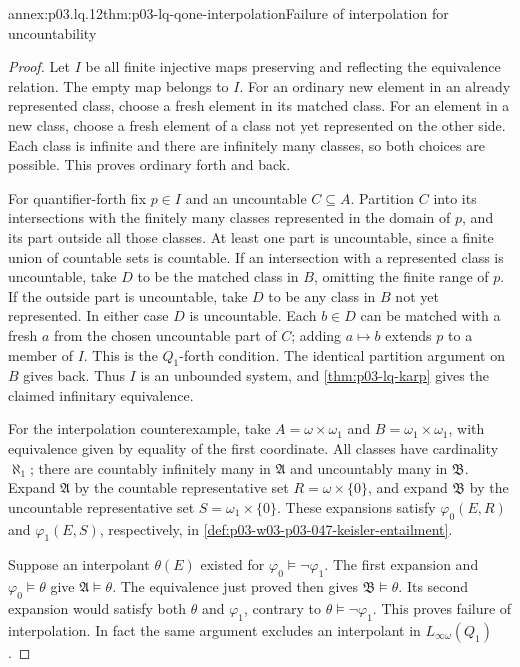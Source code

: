\begin{annexitem}{annex:p03.lq.12}{thm:p03-lq-qone-interpolation}{Failure of interpolation for uncountability}
\begin{proof}
Let \(I\) be all finite injective maps preserving and reflecting
the equivalence relation. The empty map belongs to \(I\).
For an ordinary new element in an already represented class,
choose a fresh element in its matched class. For an element in a
new class, choose a fresh element of a class not yet represented
on the other side. Each class is infinite and there are infinitely
many classes, so both choices are possible. This proves ordinary
forth and back.

For quantifier-forth fix \(p\in I\) and an uncountable
\(C\subseteq A\). Partition \(C\) into its intersections with
the finitely many classes represented in the domain of \(p\),
and its part outside all those classes. At least one part is
uncountable, since a finite union of countable sets is countable.
If an intersection with a represented class is uncountable, take
\(D\) to be the matched class in \(B\), omitting the finite
range of \(p\). If the outside part is uncountable, take \(D\)
to be any class in \(B\) not yet represented. In either case
\(D\) is uncountable. Each \(b\in D\) can be matched with a
fresh \(a\) from the chosen uncountable part of \(C\); adding
\(a\mapsto b\) extends \(p\) to a member of \(I\).
This is the \(Q_1\)-forth condition. The identical partition
argument on \(B\) gives back. Thus \(I\) is an unbounded system,
and \cref{thm:p03-lq-karp} gives the claimed infinitary equivalence.

For the interpolation counterexample, take
\(A=\omega\times\omega_1\) and \(B=\omega_1\times\omega_1\),
with equivalence given by equality of the first coordinate.
All classes have cardinality \(\aleph_1\); there are countably
infinitely many in \(\mathfrak A\) and uncountably many in
\(\mathfrak B\). Expand \(\mathfrak A\) by the countable
representative set \(R=\omega\times\{0\}\), and expand
\(\mathfrak B\) by the uncountable representative set
\(S=\omega_1\times\{0\}\). These expansions satisfy
\(\varphi_0(E,R)\) and \(\varphi_1(E,S)\), respectively, in
\cref{def:p03-w03-p03-047-keisler-entailment}.

Suppose an interpolant \(\theta(E)\) existed for
\(\varphi_0\models\neg\varphi_1\).
The first expansion and \(\varphi_0\models\theta\) give
\(\mathfrak A\models\theta\). The equivalence just proved
then gives \(\mathfrak B\models\theta\). Its second expansion
would satisfy both \(\theta\) and \(\varphi_1\), contrary to
\(\theta\models\neg\varphi_1\). This proves failure of
interpolation. In fact the same argument excludes an interpolant
in \(L_{\infty\omega}(Q_1)\).
\end{proof}
\end{annexitem}

